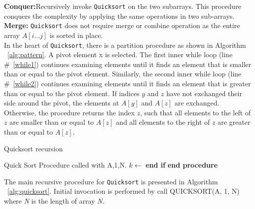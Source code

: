 \documentclass[a4paper, 11pt,twocolumn]{article}
\begin{document}
\noindent
\textbf{Conquer:}Recursively invoke \texttt{Quicksort} on the two subarrays. This procedure conquers the complexity by applying the same operations in two sub-arrays.\\
\textbf{Merge:} \texttt{Quicksort} does not require merge or combine operation as the entire array $A[i...j]$ is sorted in place.\\
In the heart of \texttt{Quicksort}, there is a partition procedure as shown in Algorithm ~\ref{alg:pattern}. A pivot element x is selected. The first inner while loop (line \#~\ref{while1}) continues examining elements until it finds an element that is smaller than or equal to the pivot element. Similarly, the second inner while loop (line \#~\ref{while2}) continues examining elements until it finds an element that is greater than or equal to the pivot element. If indices $y$ and $z$ have not exchanged their side around the pivot, the elements at $A[y]$ and $A[z]$ are exchanged. Otherwise, the procedure returns the index $z$, such that all elements to the left of $z$ are smaller than or equal to $A[z]$ and all elements to the right of $z$ are greater than or equal to $A[z]$.\\
\begin{algorithm}
\caption{Quicksort recursion}\label{alg:quicksort}
			\begin{algorithmic}[1]
            \item [\Comment Quick Sort Procedure called with A,1,N.]
                	\State $k \gets $ 
                    \State  {}
                    \State  {}
                \EndIf
                \State \textbf{end if}
            \EndProcedure
			\State \textbf{end procedure}
			\end{algorithmic}
\end{algorithm}
The main recursive procedure for \texttt{Quicksort} is presented in Algorithm ~\ref{alg:quicksort}. Initial invocation is performed by call QUICKSORT(A, 1, N) where \textit{N} is the length of array \textit{N}.
\end{document}
